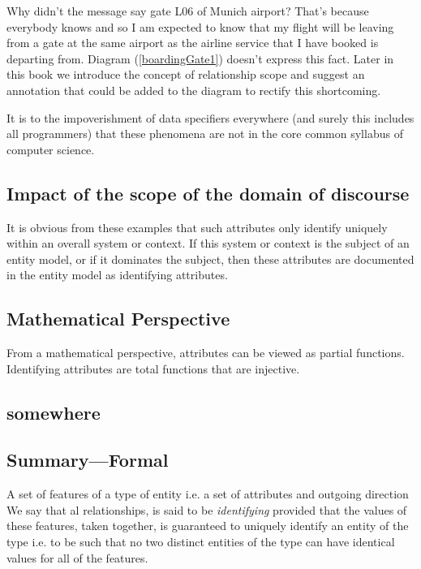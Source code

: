 \mynote 
Why didn't the message say gate L06 of Munich airport?
That's because everybody knows and so I am expected to know that my flight will be leaving from a gate at the same airport as the airline service that I have booked is departing from. 
Diagram (\ref{boardingGate1}) doesn't express this fact. 
Later in this book we introduce the concept of relationship scope and 
suggest an annotation that could be added to the diagram to rectify this shortcoming.

It is to the impoverishment of data specifiers everywhere (and surely this includes all programmers) that these phenomena are not in the core common syllabus of computer science. 

\subsection{Impact of the scope of the domain of discourse}
\mynote
It is obvious from these examples that such attributes only identify uniquely within an overall system or context. If this system or context is the subject of an entity model, or if it dominates the subject, then these attributes are documented in the entity model as identifying attributes. 

\subsection {Mathematical Perspective}
\mynote From a mathematical perspective, attributes can be viewed as partial functions. Identifying attributes are total functions that are injective.  



\subsection{somewhere}


\subsection{Summary---Formal}
\mynote A set of features of a type of entity i.e. a set of attributes and outgoing direction We say that al relationships, is said to be \textit{identifying} provided that the values of these features,
taken together, is guaranteed to uniquely identify an entity of the type i.e. to be such that no two distinct entities of the type can have identical values for all of the features. 


